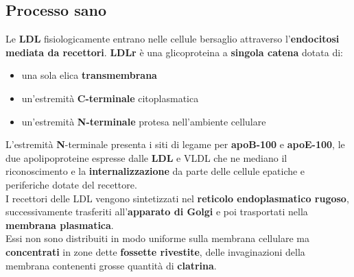 \documentclass[a4paper, 12pt]{article}
\begin{document}
\begin{titlepage}
\section{Processo sano}
Le \textbf{LDL} fisiologicamente entrano nelle cellule bersaglio attraverso l’\textbf{endocitosi mediata da recettori}. \textbf{LDLr} è una glicoproteina a \textbf{singola catena} dotata di:
\begin{itemize}
  \item una sola elica \textbf{transmembrana}
  \item un'estremità \textbf{C-terminale} citoplasmatica
  \item un'estremità \textbf{N-terminale} protesa nell'ambiente cellulare
\end{itemize}
L'estremità \textbf{N}-terminale presenta i siti di legame per \textbf{apoB-100} e \textbf{apoE-100}, le due apolipoproteine espresse dalle \textbf{LDL} e VLDL che ne mediano il riconoscimento e la \textbf{internalizzazione} da parte delle cellule epatiche e periferiche dotate del recettore.\\
I recettori delle LDL vengono sintetizzati nel \textbf{reticolo endoplasmatico rugoso}, successivamente trasferiti all’\textbf{apparato di Golgi} e poi trasportati nella \textbf{membrana plasmatica}.\\
Essi non sono distribuiti in modo uniforme sulla membrana cellulare ma \textbf{concentrati} in zone dette \textbf{fossette rivestite}, delle invaginazioni della membrana contenenti grosse quantità di \textbf{clatrina}.

\end{titlepage}
\end{document}
